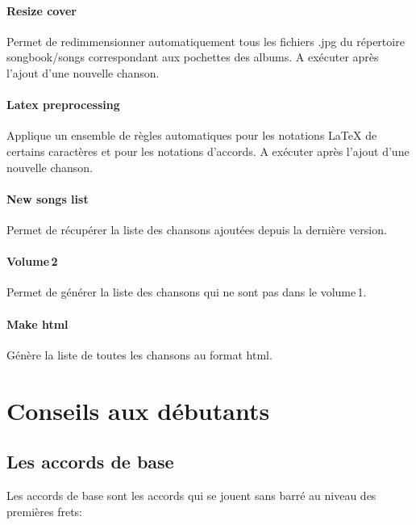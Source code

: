 \documentclass[a4paper,twoside]{article}
\begin{document}
\paragraph{Resize cover}
Permet de redimmensionner automatiquement tous les fichiers .jpg du
répertoire songbook/songs correspondant aux pochettes des albums.
A exécuter après l'ajout d'une nouvelle chanson.

\paragraph{Latex preprocessing}
Applique un ensemble de règles automatiques pour les notations LaTeX
de certains caractères et pour les notations d'accords.
A exécuter après l'ajout d'une nouvelle chanson.

\paragraph{New songs list}
Permet de récupérer la liste des chansons ajoutées depuis la dernière
version.

\paragraph{Volume\,2}
Permet de générer la liste des chansons qui ne sont pas dans le volume\,1.

\paragraph{Make html}
Génère la liste de toutes les chansons au format html.


\section{Conseils aux débutants}

\subsection{Les accords de base}

Les accords de base sont les accords qui se jouent sans barré au
niveau des premières frets:
\end{document}
